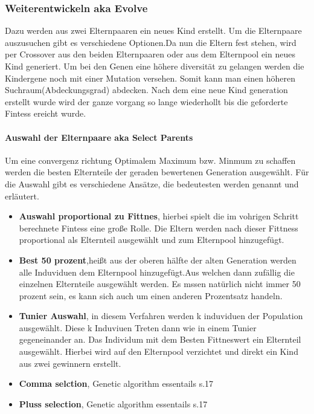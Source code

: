 \subsubsection{Weiterentwickeln aka Evolve}
Dazu werden aus zwei Elternpaaren ein neues Kind erstellt. Um die Elternpaare auszusuchen gibt es verschiedene Optionen.Da nun die Eltern fest stehen, wird per Crossover aus den beiden Elternpaaren oder aus dem Elternpool ein neues Kind generiert. Um bei den Genen eine höhere diversität zu gelangen werden die Kindergene noch mit einer Mutation versehen. Somit kann man einen höheren Suchraum(Abdeckungsgrad) abdecken. Nach dem eine neue Kind generation erstellt wurde wird der ganze vorgang so lange wiederhollt bis die geforderte Fintess ereicht wurde.

\paragraph{Auswahl der Elternpaare aka Select Parents}
Um eine convergenz richtung Optimalem Maximum bzw. Minmum zu schaffen werden die besten Elternteile der geraden bewertenen Generation ausgewählt.
Für die Auswahl gibt es verschiedene Ansätze, die bedeutesten werden genannt und erläutert.
\begin{itemize}
\item \textbf{Auswahl proportional zu Fittnes}, hierbei spielt die im vohrigen Schritt berechnete Fintess eine große Rolle. Die Eltern werden nach dieser Fittness proportional als Elternteil ausgewählt und zum Elternpool hinzugefügt.
\item \textbf{Best 50 prozent},heißt aus der oberen hälfte der alten Generation werden alle Induviduen dem Elternpool hinzugefügt.Aus welchen dann zufällig die einzelnen Elternteile ausgewählt werden. Es mssen natürlich nicht immer 50 prozent sein, es kann sich auch um einen anderen Prozentsatz handeln.
\item \textbf{Tunier Auswahl}, in diesem Verfahren werden k induviduen der Population ausgewählt. Diese k Induviuen Treten dann wie in einem Tunier gegeneinander an. Das Individum mit dem Besten Fittneswert ein Elternteil ausgewählt. Hierbei wird auf den Elternpool verzichtet und direkt ein Kind aus zwei gewinnern erstellt.
\item \textbf{Comma selction}, Genetic algorithm essentails s.17
\item \textbf{Pluss selection}, Genetic algorithm essentails s.17
\end{itemize}


